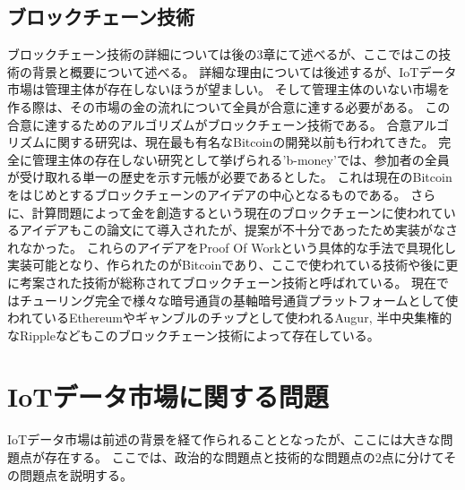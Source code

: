 \subsection{ブロックチェーン技術}
ブロックチェーン技術の詳細については後の3章にて述べるが、ここではこの技術の背景と概要について述べる。
詳細な理由については後述するが、IoTデータ市場は管理主体が存在しないほうが望ましい。
そして管理主体のいない市場を作る際は、その市場の金の流れについて全員が合意に達する必要がある。
この合意に達するためのアルゴリズムがブロックチェーン技術である。
合意アルゴリズムに関する研究は、現在最も有名なBitcoin\cite{Bitcoin}の開発以前も行われてきた。
完全に管理主体の存在しない研究として挙げられる'b-money'\cite{b-money}では、参加者の全員が受け取れる単一の歴史を示す元帳が必要であるとした。
これは現在のBitcoinをはじめとするブロックチェーンのアイデアの中心となるものである。
さらに、計算問題によって金を創造するという現在のブロックチェーンに使われているアイデアもこの論文にて導入されたが、提案が不十分であったため実装がなされなかった。
これらのアイデアをProof Of Workという具体的な手法で具現化し実装可能となり、作られたのがBitcoinであり、ここで使われている技術や後に更に考案された技術が総称されてブロックチェーン技術と呼ばれている。
現在ではチューリング完全で様々な暗号通貨の基軸暗号通貨プラットフォームとして使われているEthereum\cite{ethereum}やギャンブルのチップとして使われるAugur\cite{Augur}, 半中央集権的なRipple\cite{Ripple}などもこのブロックチェーン技術によって存在している。

\section{IoTデータ市場に関する問題}
IoTデータ市場は前述の背景を経て作られることとなったが、ここには大きな問題点が存在する。
ここでは、政治的な問題点と技術的な問題点の2点に分けてその問題点を説明する。


